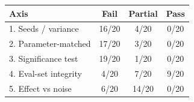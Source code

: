 \begin{tabular}{lccc}
\toprule
Axis & Fail & Partial & Pass \\
\midrule
1. Seeds / variance & 16/20 & 4/20 & 0/20 \\
2. Parameter-matched & 17/20 & 3/20 & 0/20 \\
3. Significance test & 19/20 & 1/20 & 0/20 \\
4. Eval-set integrity & 4/20 & 7/20 & 9/20 \\
5. Effect vs noise & 6/20 & 14/20 & 0/20 \\
\bottomrule
\end{tabular}
